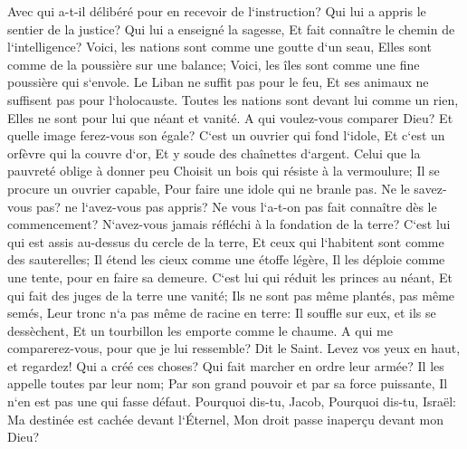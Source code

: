 \verse Avec qui a-t-il délibéré pour en recevoir de l`instruction? Qui lui a appris le sentier de la justice? Qui lui a enseigné la sagesse, Et fait connaître le chemin de l`intelligence? 
\verse Voici, les nations sont comme une goutte d`un seau, Elles sont comme de la poussière sur une balance; Voici, les îles sont comme une fine poussière qui s`envole. 
\verse Le Liban ne suffit pas pour le feu, Et ses animaux ne suffisent pas pour l`holocauste. 
\verse Toutes les nations sont devant lui comme un rien, Elles ne sont pour lui que néant et vanité. 
\verse A qui voulez-vous comparer Dieu? Et quelle image ferez-vous son égale? 
\verse C`est un ouvrier qui fond l`idole, Et c`est un orfèvre qui la couvre d`or, Et y soude des chaînettes d`argent. 
\verse Celui que la pauvreté oblige à donner peu Choisit un bois qui résiste à la vermoulure; Il se procure un ouvrier capable, Pour faire une idole qui ne branle pas. 
\verse Ne le savez-vous pas? ne l`avez-vous pas appris? Ne vous l`a-t-on pas fait connaître dès le commencement? N`avez-vous jamais réfléchi à la fondation de la terre? 
\verse C`est lui qui est assis au-dessus du cercle de la terre, Et ceux qui l`habitent sont comme des sauterelles; Il étend les cieux comme une étoffe légère, Il les déploie comme une tente, pour en faire sa demeure. 
\verse C`est lui qui réduit les princes au néant, Et qui fait des juges de la terre une vanité; 
\verse Ils ne sont pas même plantés, pas même semés, Leur tronc n`a pas même de racine en terre: Il souffle sur eux, et ils se dessèchent, Et un tourbillon les emporte comme le chaume. 
\verse A qui me comparerez-vous, pour que je lui ressemble? Dit le Saint. 
\verse Levez vos yeux en haut, et regardez! Qui a créé ces choses? Qui fait marcher en ordre leur armée? Il les appelle toutes par leur nom; Par son grand pouvoir et par sa force puissante, Il n`en est pas une qui fasse défaut. 
\verse Pourquoi dis-tu, Jacob, Pourquoi dis-tu, Israël: Ma destinée est cachée devant l`Éternel, Mon droit passe inaperçu devant mon Dieu? 
